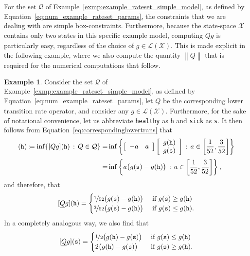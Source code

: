 \documentclass[10pt,a4paper]{paper}
\theoremstyle{definition}
\newtheorem{exmp}{Example}
\newcommand{\states}{\mathcal{X}}
\newcommand{\gambles}{\mathcal{L}}
\newcommand{\gamblesX}{\gambles(\states)}
\newcommand{\rateset}{\mathcal{Q}}
\newcommand{\lrate}{\underline{Q}}
\newcommand{\norm}[1]{\left\lVert #1 \right\rVert}
\newcommand{\coloneqq}{:\!=}
\begin{document}
For the set $\rateset$ of Example~\ref{exmp:example_rateset_simple_model}, as defined by Equation~\eqref{eq:num_example_rateset_params}, the constraints that we are dealing with are simple box-constraints. Furthermore, because the state-space $\states$ contains only two states in this specific example model, computing $\lrate g$ is particularly easy, regardless of the choice of $g\in\gamblesX$. This is made explicit in the following example, where we also compute the quantity $\norm{\lrate}$ that is required for the numerical computations that follow.

\begin{exmp}\label{exmp:numerical_lrate}
Consider the set $\rateset$ of Example~\ref{exmp:example_rateset_simple_model}, as defined by Equation~\eqref{eq:num_example_rateset_params}, let $\lrate$ be the corresponding lower transition rate operator, and consider any $g\in\gamblesX$. Furthermore, for the sake of notational convenience, let us abbreviate {\tt healthy} as {\tt h} and {\tt sick} as {\tt s}. It then follows from Equation~\eqref{eq:correspondinglowertrans} that
\begin{align*}
[\lrate g](\text{{\tt h}})
\coloneqq
\inf\{[Qg](\text{{\tt h}})\,:\,Q\in\rateset\}
=&
\inf\left\{\left[\begin{array}{rr}-a & a \end{array}\right]\left[\begin{array}{l} g(\text{{\tt h}}) \\ g(\text{{\tt s}}) \end{array}\right]\,:\,a\in\left[\frac{1}{52}, \frac{3}{52} \right]\right\} \\[2pt]
=&\inf\left\{a\big(g(\text{{\tt s}})-g(\text{{\tt h}})\big)\,:\,a\in\left[\frac{1}{52}, \frac{3}{52} \right]\right\},
\vspace{-6pt}
\end{align*}
and therefore, that
\begin{equation}\label{eq:lratehealthexample:h}
[\lrate g](\text{{\tt h}})
=
\begin{cases}
\nicefrac{1}{52}\big(g(\text{{\tt s}})-g(\text{{\tt h}})\big)
&\text{ if $g(\text{{\tt s}})\geq g(\text{{\tt h}})$}\\
\nicefrac{3}{52}\big(g(\text{{\tt s}})-g(\text{{\tt h}})\big)
&\text{ if $g(\text{{\tt s}})\leq g(\text{{\tt h}})$}.
\end{cases}
\end{equation}
In a completely analogous way, we also find that
\begin{equation}\label{eq:lratehealthexample:s}
[\lrate g](\text{{\tt s}})
=
\begin{cases}
\nicefrac{1}{2}\big(g(\text{{\tt h}})-g(\text{{\tt s}})\big)
&\text{ if $g(\text{{\tt s}})\leq g(\text{{\tt h}})$}\\
2\big(g(\text{{\tt h}})-g(\text{{\tt s}})\big)
&\text{ if $g(\text{{\tt s}})\geq g(\text{{\tt h}})$}.
\end{cases}
\end{equation}


\end{exmp}
\end{document}
